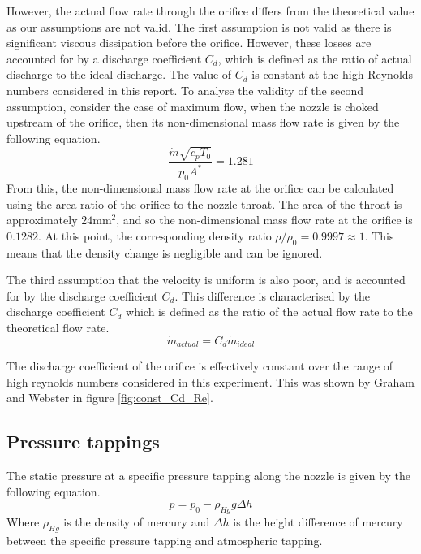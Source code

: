 \documentclass{article}
\begin{document}
However, the actual flow rate through the orifice differs from the theoretical value as our assumptions are not valid.
The first assumption is not valid as there is significant viscous dissipation before the orifice. However, these losses are accounted for by a discharge coefficient $C_d$, which is defined as the ratio of actual discharge to the ideal discharge.
The value of $C_d$ is constant at the high Reynolds numbers considered in this report.
To analyse the validity of the second assumption, consider the case of maximum flow, when the nozzle is choked upstream of the orifice, then its non-dimensional mass flow rate is given by the following equation.
\begin{equation}
    \frac{\dot{m}\sqrt{c_pT_0}}{p_0A^*} = 1.281
\end{equation}
From this, the non-dimensional mass flow rate at the orifice can be calculated using the area ratio of the orifice to the nozzle throat.
The area of the throat is approximately $24\text{mm}^2$, and so the non-dimensional mass flow rate at the orifice is $0.1282$.
At this point, the corresponding density ratio $\rho/\rho_0 = 0.9997 \approx 1$. This means that the density change is negligible and can be ignored.

The third assumption that the velocity is uniform is also poor, and is accounted for by the discharge coefficient $C_d$.
This difference is characterised by the discharge coefficient $C_d$ which is defined as the ratio of the actual flow rate to the theoretical flow rate.
\begin{equation}
    \dot{m}_{actual} = C_d \dot{m}_{ideal}
\end{equation}

The discharge coefficient of the orifice is effectively constant over the range of high reynolds numbers considered in this experiment.
This was shown by Graham and Webster \cite{Graham_K_Webster:2019} in figure \ref{fig:const_Cd_Re}.

\subsection{Pressure tappings}

The static pressure at a specific pressure tapping along the nozzle is given by the following equation.
\begin{equation}
    p = p_0 - \rho_{Hg} g \Delta h
\end{equation}
Where $\rho_{Hg}$ is the density of mercury and $\Delta h$ is the height difference of mercury between the specific pressure tapping and atmospheric tapping.
\end{document}
